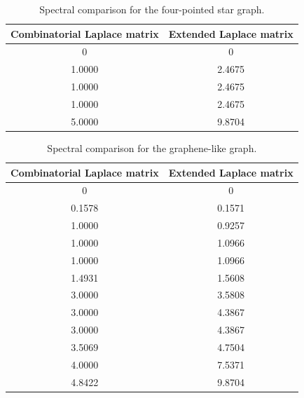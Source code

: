 
\begin{table}[htbp]
\centering
\begin{tabular}{c c}
\hline
Combinatorial Laplace matrix & Extended Laplace matrix \\
\hline
0 & 0 \\
1.0000 & 2.4675 \\
1.0000 & 2.4675 \\
1.0000 & 2.4675 \\
5.0000 & 9.8704 \\
\hline
\end{tabular}
\caption{Spectral comparison for the four-pointed star graph.}
\label{tab:spectral_star_comparison}
\end{table}

\begin{table}[htbp]
\centering
\begin{tabular}{c c}
\hline
Combinatorial Laplace matrix & Extended Laplace matrix \\
\hline
0 & 0 \\
0.1578 & 0.1571 \\
1.0000 & 0.9257 \\
1.0000 & 1.0966 \\
1.0000 & 1.0966 \\
1.4931 & 1.5608 \\
3.0000 & 3.5808 \\
3.0000 & 4.3867 \\
3.0000 & 4.3867 \\
3.5069 & 4.7504 \\
4.0000 & 7.5371 \\
4.8422 & 9.8704 \\
\hline
\end{tabular}
\caption{Spectral comparison for the graphene-like graph.}
\label{tab:spectral_graphene_comparison}
\end{table}

